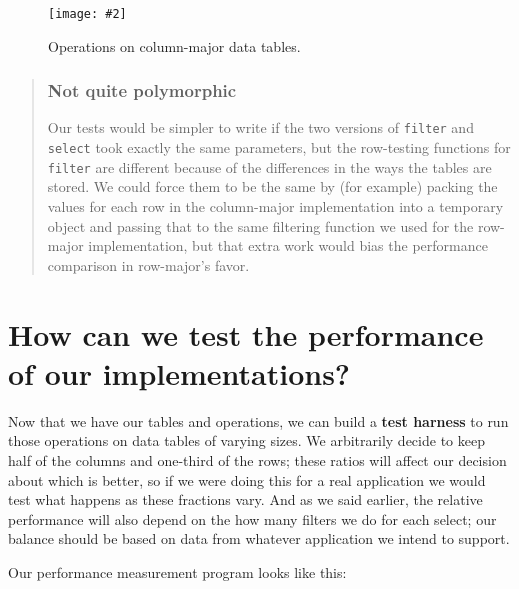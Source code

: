 \documentclass[krantzl]{krantz}
\newcommand{\figpdf}[4]{\begin{figure}%
\centering%
\texttt{[image: \#2]}%
\caption{#3}%
\label{#1}%
\end{figure}}
\newcommand{\glossref}[1]{\textbf{#1}}
\newenvironment{callout}{\savenotes\begin{tBox}\begin{quotation}\toggletrue{inbox}\renewcommand{\thempfootnote}{\arabic{footnote}}}{\end{quotation}\vspace{\baselineskip}\end{tBox}\togglefalse{inbox}\spewnotes}
\begin{document}
\figpdf{data-table-col-ops}{./data-table/col-ops.pdf}{Operations on column-major data tables.}{0.6}

\begin{callout}


\subsubsection*{Not quite polymorphic}


Our tests would be simpler to write if the two versions of \texttt{filter} and \texttt{select}
took exactly the same parameters,
but the row-testing functions for \texttt{filter} are different
because of the differences in the ways the tables are stored.
We could force them to be the same by (for example)
packing the values for each row in the column-major implementation
into a temporary object
and passing that to the same filtering function we used for the row-major implementation,
but that extra work would bias the performance comparison in row-major’s favor.

\end{callout}

\section{How can we test the performance of our implementations?}\label{data-table-profile}


Now that we have our tables and operations,
we can build a \glossref{test harness} to run those operations
on data tables of varying sizes.
We arbitrarily decide to keep half of the columns and one-third of the rows;
these ratios will affect our decision about which is better,
so if we were doing this for a real application we would test what happens
as these fractions vary.
And as we said earlier,
the relative performance will also depend on the how many filters we do for each select;
our balance should be based on data from whatever application we intend to support.


Our performance measurement program looks like this:
\end{document}
